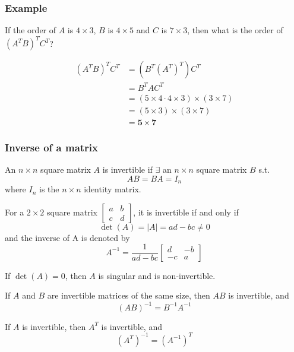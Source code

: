 \documentclass[../linear-algebra.tex]{subfiles}
\begin{document}
\subsubsection*{Example}
If the order of $A$ is $4\times3$, $B$ is $4\times5$ and $C$ is $7\times3$,
then what is the order of $(A^TB)^TC^T$?

\begin{align*}
    (A^T B)^T C^T &= (B^T (A^T)^T) C^T \\
    &= B^T A C^T \\
    &= (5 \times 4 \cdot 4 \times 3) \times (3 \times 7) \\
    &= (5 \times 3) \times (3 \times 7) \\
    &= \mathbf{5 \times 7}
\end{align*}

\subsubsection*{Inverse of a matrix}
An $n\times n$ square matrix $A$ is invertible if $\exists$ an $n\times n$
square matrix $B$ s.t.
\[AB = BA = I_n\]
where $I_n$ is the $n\times n$ identity matrix.

\noindent For a $2\times2$ square matrix $\begin{bmatrix}
    a & b \\ c & d
\end{bmatrix}$, it is invertible if and only if
\[\det(A) = |A| = ad - bc \neq 0\]
and the inverse of A is denoted by
\[A^{-1} = \frac{1}{ad-bc}\begin{bmatrix}
    d & -b \\ -c & a
\end{bmatrix}\]

\noindent If $\det(A) = 0$, then $A$ is singular and is non-invertible.

\medskip

\noindent If $A$ and $B$ are invertible matrices of the same size, then
$AB$ is invertible, and
\[(AB)^{-1} = B^{-1}A^{-1}\]

\noindent If $A$ is invertible, then $A^T$ is invertible, and
\[(A^T)^{-1} = (A^{-1})^T\]
\end{document}
